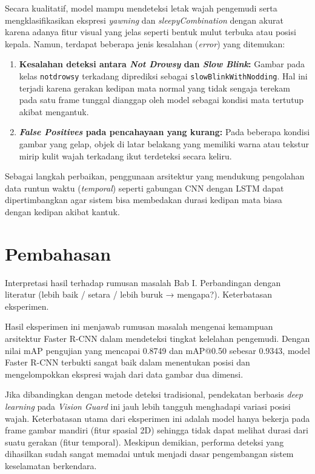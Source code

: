 \documentclass[11pt,a4paper,oneside]{report}
\begin{document}
Secara kualitatif, model mampu mendeteksi letak wajah pengemudi serta mengklasifikasikan ekspresi \textit{yawning} dan \textit{sleepyCombination} dengan akurat karena adanya fitur visual yang jelas seperti bentuk mulut terbuka atau posisi kepala. Namun, terdapat beberapa jenis kesalahan (\textit{error}) yang ditemukan:
\begin{enumerate}
    \item \textbf{Kesalahan deteksi antara \textit{Not Drowsy} dan \textit{Slow Blink}:} Gambar pada kelas \texttt{notdrowsy} terkadang diprediksi sebagai \texttt{slowBlinkWithNodding}. Hal ini terjadi karena gerakan kedipan mata normal yang tidak sengaja terekam pada satu frame tunggal dianggap oleh model sebagai kondisi mata tertutup akibat mengantuk.
    \item \textbf{\textit{False Positives} pada pencahayaan yang kurang:} Pada beberapa kondisi gambar yang gelap, objek di latar belakang yang memiliki warna atau tekstur mirip kulit wajah terkadang ikut terdeteksi secara keliru.
\end{enumerate}
Sebagai langkah perbaikan, penggunaan arsitektur yang mendukung pengolahan data runtun waktu (\textit{temporal}) seperti gabungan CNN dengan LSTM dapat dipertimbangkan agar sistem bisa membedakan durasi kedipan mata biasa dengan kedipan akibat kantuk.

\section{Pembahasan}
\begin{petunjuk}
Interpretasi hasil terhadap rumusan masalah Bab I. Perbandingan dengan literatur (lebih baik / setara / lebih buruk → mengapa?). Keterbatasan eksperimen.
\end{petunjuk}

Hasil eksperimen ini menjawab rumusan masalah mengenai kemampuan arsitektur Faster R-CNN dalam mendeteksi tingkat kelelahan pengemudi. Dengan nilai mAP pengujian yang mencapai 0.8749 dan mAP@0.50 sebesar 0.9343, model Faster R-CNN terbukti sangat baik dalam menentukan posisi dan mengelompokkan ekspresi wajah dari data gambar dua dimensi.

Jika dibandingkan dengan metode deteksi tradisional, pendekatan berbasis \textit{deep learning} pada \textit{Vision Guard} ini jauh lebih tangguh menghadapi variasi posisi wajah. Keterbatasan utama dari eksperimen ini adalah model hanya bekerja pada frame gambar mandiri (fitur spasial 2D) sehingga tidak dapat melihat durasi dari suatu gerakan (fitur temporal). Meskipun demikian, performa deteksi yang dihasilkan sudah sangat memadai untuk menjadi dasar pengembangan sistem keselamatan berkendara.
\end{document}
